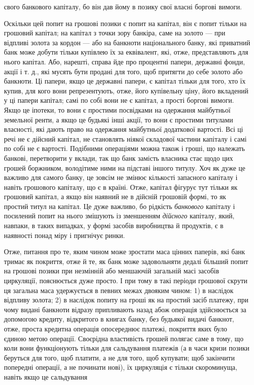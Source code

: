 \parcont{}  %
свого банкового капіталу, бо він дав йому в позику свої власні
боргові вимоги.

Оскільки цей попит на грошові позики є попит на капітал,
він є попит тільки на грошовий капітал; на капітал з точки
зору банкіра, саме на золото — при відпливі золота за кордон —
або на банкноти національного банку, які приватний банк може
добути тільки купівлею їх за еквівалент, які, отже, представляють
для нього капітал. Або, нарешті, справа йде про процентні
папери, державні фонди, акції і т. д., які мусять бути
продані для того, щоб притягти до себе золото або банкноти.
Ці папери, якщо це державні папери, є капітал тільки для
того, хто їх купив, для кого вони репрезентують, отже, його
купівельну ціну, його вкладений у ці папери капітал; самі по
собі вони не є капітал, а прості боргові вимоги. Якщо це
іпотеки, то вони є простими посвідками на одержання майбутньої
земельної ренти, а якщо це будьякі інші акції, то вони
є простими титулами власності, які дають право на одержання
майбутньої додаткової вартості. Всі ці речі не є дійсний капітал,
не становлять ніякої складової частини капіталу і самі по собі
не є вартості. Подібними операціями можна також і гроші, що
належать банкові, перетворити у вклади, так що банк замість
власника стає щодо цих грошей боржником, володітиме ними
на підставі іншого титулу. Хоч як дуже це важливо для самого
банку, це зовсім не змінює кількості запасного капіталу і навіть
грошового капіталу, що є в країні. Отже, капітал фігурує тут
тільки як грошовий капітал, а якщо він наявний не в дійсній
грошовій формі, то як простий титул на капітал. Це дуже важливо,
бо рідкість \emph{банкового} капіталу і посилений попит на нього
змішують із зменшенням \emph{дійсного} капіталу, який, навпаки, в таких
випадках, у формі засобів виробництва й продуктів, є в наявності
понад міру і пригнічує ринки.

Отже, питання про те, яким чином може зростати маса цінних
паперів, які банк тримає як покриття, отже й те, як банк
може задовольняти дедалі більший попит на грошові позики при
незмінній або меншаючій загальній масі засобів циркуляції,
пояснюється дуже просто. І при тому в такі періоди грошової
скрути ця загальна маса удержується в певних межах двояким
чином: 1) в наслідок відпливу золота; 2) в наслідок попиту на
гроші як на простий засіб платежу, при чому видані банкноти
відразу припливають назад абож операція здійснюється за
допомогою кредиту, відкритого в книгах банку, без будьякої
видачі банкнот, отже, проста кредитна операція опосереднює
платежі, покриття яких було єдиною метою операції. Своєрідна
властивість грошей полягає саме в тому, що коли вони
функціонують тільки для сальдування платежів (а в часи кризи
позики беруться для того, щоб платити, а не для того, щоб
купувати; щоб закінчити попередні операції, а не починати нові), їх
циркуляція є тільки скороминуща, навіть якщо це сальдування
\parbreak{}  %
